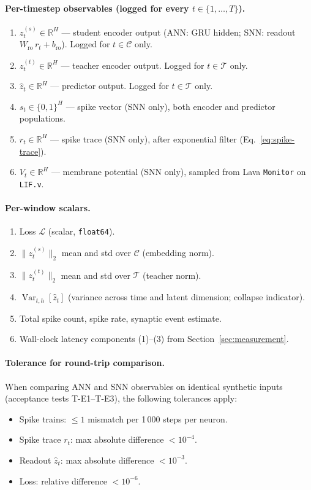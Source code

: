\documentclass[11pt,a4paper]{article}
\begin{document}
\paragraph{Per-timestep observables (logged for every $t \in \{1,\dots,T\}$).}
\begin{enumerate}[nosep,label=\textbf{O\arabic*.}]
\item $z_t^{(s)} \in \mathbb{R}^H$ --- student encoder output (ANN:
  GRU hidden; SNN: readout $W_{\text{ro}}\,r_t + b_{\text{ro}}$).
  Logged for $t \in \mathcal{C}$ only.
\item $z_t^{(t)} \in \mathbb{R}^H$ --- teacher encoder output.
  Logged for $t \in \mathcal{T}$ only.
\item $\hat{z}_t \in \mathbb{R}^H$ --- predictor output.
  Logged for $t \in \mathcal{T}$ only.
\item $s_t \in \{0,1\}^H$ --- spike vector (SNN only), both encoder and
  predictor populations.
\item $r_t \in \mathbb{R}^H$ --- spike trace (SNN only), after
  exponential filter (Eq.~\ref{eq:spike-trace}).
\item $V_t \in \mathbb{R}^H$ --- membrane potential (SNN only), sampled
  from Lava \texttt{Monitor} on \texttt{LIF.v}.
\end{enumerate}

\paragraph{Per-window scalars.}
\begin{enumerate}[nosep,label=\textbf{O\arabic*.},resume]
\item Loss $\mathcal{L}$ (scalar, \texttt{float64}).
\item $\lVert z_t^{(s)} \rVert_2$ mean and std over $\mathcal{C}$
  (embedding norm).
\item $\lVert z_t^{(t)} \rVert_2$ mean and std over $\mathcal{T}$
  (teacher norm).
\item $\operatorname{Var}_{t,h}[\hat{z}_t]$ (variance across time and
  latent dimension; collapse indicator).
\item Total spike count, spike rate, synaptic event estimate.
\item Wall-clock latency components (1)--(3) from
  Section~\ref{sec:measurement}.
\end{enumerate}

\paragraph{Tolerance for round-trip comparison.}
When comparing ANN and SNN observables on identical synthetic inputs
(acceptance tests T-E1--T-E3), the following tolerances apply:
\begin{itemize}[nosep]
\item Spike trains: $\leq 1$ mismatch per 1\,000 steps per neuron.
\item Spike trace $r_t$: max absolute difference $< 10^{-4}$.
\item Readout $\hat{z}_t$: max absolute difference $< 10^{-3}$.
\item Loss: relative difference $< 10^{-6}$.
\end{itemize}
\end{document}
